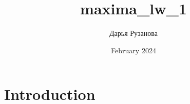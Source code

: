 \documentclass{article}
\title{maxima_lw_1}
\author{Дарья Рузанова}
\date{February 2024}
\begin{document}
\maketitle

\section{Introduction}
\end{document}
